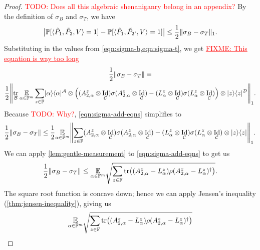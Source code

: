 \documentclass[english,12pt]{reedthesis}
\theoremstyle{plain}
\theoremstyle{definition}
\theoremstyle{remark}
\DeclareMathOperator{\Id}{Id}
\DeclareMathOperator{\tr}{tr}
\DeclarePairedDelimiter{\norm}{\lVert}{\rVert}
\DeclarePairedDelimiter{\abs}{\lvert}{\rvert}
\DeclarePairedDelimiter{\ang}{\langle}{\rangle}
\DeclarePairedDelimiter\bra{\langle}{\rvert}
\DeclarePairedDelimiter\ket{\lvert}{\rangle}
\newcommand{\TODO}[1]{\textcolor{red}{TODO: #1}}
\newcommand{\FIXME}[1]{\textcolor{red}{\ul{FIXME: #1}}}
\begin{document}
\begin{proof}
  \TODO{Does all this algebraic shenaniganry belong in an appendix?}
  By the definition of $\sigma_{B}$ and $\sigma_{T}$, we have
  \begin{equation}\label{eqn:prob-to-sigma}
    \abs*{\mathbb{P}[\ang{\tilde{P}_{1}, \tilde{P}_{2}, V} = 1] - \mathbb{P}[\ang{\tilde{P}_{1}, \tilde{P}_{2'}, V} = 1]}
    \le \frac{1}{2}\norm{\sigma_{B} - \sigma_{T}}_{1}.
  \end{equation}
  Substituting in the values from \cref{eqn:sigma-b,eqn:sigma-t}, we get
  \FIXME{This equation is way too long}
  \begin{multline}\label{eqn:sigma-add-eqns}
    \frac{1}{2}\norm{\sigma_{B} - \sigma_{T}} = \\
    \frac{1}{2}\norm*{
      \tr_{\mathcal{B}}\underset{\alpha \in \mathbb{F}^{m}}{\mathbb{E}}\sum_{z \in \mathbb{F}}
      \ket{\alpha}\bra{\alpha}^{\mathcal{A}} \otimes \mleft(
        (A_{2,\alpha}^{z} \otimes \Id_{\mathcal{C}})\sigma(A_{2,\alpha}^{z} \otimes \Id_{\mathcal{C}}) -
        (L_{\alpha}^{z} \otimes \Id_{\mathcal{C}})\sigma(L_{\alpha}^{z} \otimes \Id_{\mathcal{C}})
      \mright) \otimes \ket{z}\bra{z}^{\mathcal{D}}
    }_{1}.
  \end{multline}
  Because \TODO{Why?}, \cref{eqn:sigma-add-eqns} simplifies to
  \begin{equation}
    \frac{1}{2}\norm{\sigma_{B} - \sigma_{T}} \le
    \frac{1}{2}\underset{\alpha \in \mathbb{F}^{m}}{\mathbb{E}}\norm*{\sum_{z \in \mathbb{F}}
        (A_{2,\alpha}^{z} \otimes \Id_{\mathcal{C}})\sigma(A_{2,\alpha}^{z} \otimes \Id_{\mathcal{C}}) -
        (L_{\alpha}^{z} \otimes \Id_{\mathcal{C}})\sigma(L_{\alpha}^{z} \otimes \Id_{\mathcal{C}})
        \otimes \ket{z}\bra{z}
    }_{1}.
  \end{equation}
  We can apply \cref{lem:gentle-measurement} to \cref{eqn:sigma-add-eqns} to get
  us
  \begin{equation}
    \frac{1}{2}\norm{\sigma_{B} - \sigma_{T}} \le
    \underset{\alpha \in \mathbb{F}^{m}}{\mathbb{E}}\sqrt{
      \sum_{z \in \mathbb{F}}\tr\mleft((A_{2,\alpha}^{z} - L_{\alpha}^{z})\rho(A_{2,\alpha}^{z} - L_{\alpha}^{z})^{\dagger}\mright)
    }.
  \end{equation}
  The square root function is concave down; hence we can apply Jensen's
  inequality (\cref{thm:jensen-inequality}), giving us
  \begin{equation}
    \underset{\alpha \in \mathbb{F}^{m}}{\mathbb{E}}\sqrt{
      \sum_{z \in \mathbb{F}}\tr\mleft((A_{2,\alpha}^{z} - L_{\alpha}^{z})\rho(A_{2,\alpha}^{z} - L_{\alpha}^{z})^{\dagger}\mright)
}
\end{equation}
\end{proof}
\end{document}
